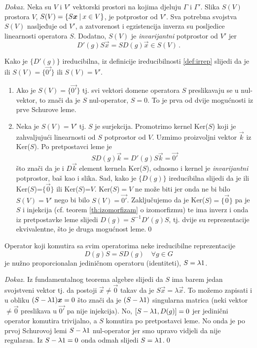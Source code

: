 \emph{Dokaz.}
Neka su $V$ i $V'$ vektorski prostori na kojima djeluju $\Gamma$ i $\Gamma'$.
Slika $S(V)$ prostora $V$, $S(V)=\{S\vec{x} \td x \in V \}$, je potprostor od $V'$. 
Sva potrebna svojstva
$S(V)$ nasljeđuje od $V'$, a zatvorenost i egzistencija inverza su 
posljedice linearnosti operatora $S$.
Dodatno, $S(V)$ je \emph{invarijantni} potprostor od $V'$ jer
$$D'(g)S\vec{x}=SD(g)\vec{x} \in S(V)\,.$$

Kako je $\{D'(g)\}$ ireducibilna, iz
definicije ireducibilnosti \ref{def:irrep} slijedi
da je ili $S(V)=\{\vec{0'}\}$ ili $S(V)=V'$.

\begin{enumerate}
\item Ako je $S(V)=\{\vec{0'}\}$ tj. svi vektori domene operatora $S$
    preslikavaju se u nul-vektor, to znači da je $S$ nul-operator,  $S=0$.
    To je prva od dvije mogućnosti iz prve Schurove leme.

\item Neka je $S(V)=V'$ tj. $S$ je surjekcija. Promotrimo 
    kernel Ker($S$) koji je zahvaljujući linearnosti od $S$
    potprostor od $V$.
    Uzmimo proizvoljni vektor $\vec{k}$ iz Ker($S$).
    Po pretpostavci leme je 
    $$ S D(g) \vec{k} = D'(g)S\vec{k} = \vec{0'}$$
    što znači da je i $D\vec{k}$ element kernela Ker($S$), odnosno
    i kernel je \emph{invarijantni} potprostor, baš kao i slika.
    Sad, kako je $\{D(g)\}$ ireducibilna slijedi da je ili
    Ker($S$)=$\{\vec{0}\}$ ili Ker($S$)=$V$.
    Ker($S$)$=V$ ne može biti jer onda ne bi bilo $S(V)=V'$ nego bi bilo
      $S(V)=\vec{0'}$.
    Zaključujemo da je Ker($S$)$=\{\vec{0}\}$ pa je $S$ i injekcija (cf.
    teorem \ref{th:izomorfizam} o izomorfizmu) te ima inverz
    i onda iz pretpostavke leme slijedi $D(g)=S^{-1}D'(g)S$, tj.
    dvije su reprezentacije ekvivalentne, što je druga mogućnost leme.\qed 
\end{enumerate}

\begin{teorem}
Operator koji komutira sa svim operatorima neke ireducibilne 
reprezentacije
\begin{displaymath}
  D(g)S=SD(g) \quad \forall g\in G
\end{displaymath}
je nužno proporcionalan jediničnom operatoru
(identiteti), $S = \lambda 1$.
\end{teorem}

\emph{Dokaz.} Iz fundamentalnog teorema algebre slijedi da $S$ ima
barem jedan svojstveni vektor tj. da postoji
$\vec{x}\neq\vec{0}$ takav da je $S\vec{x}=\lambda\vec{x}$.
To možemo zapisati i u obliku $(S-\lambda\Eins)\vec{x}=0$ što
znači da je $(S-\lambda1)$
singularna matrica (neki vektor $\neq \vec{0}$ preslikava u
$\vec{0'}$ pa nije injekcija).
No, $[S-\lambda1, D(g)]=0$
jer jedinični operator komutira trivijalno, a $S$ komutira po pretpostavci leme.
No onda je po prvoj Schurovoj lemi $S-\lambda1$ nul-operator jer smo upravo vidjeli
da nije regularan. Iz $S-\lambda1=0$ onda odmah slijedi $S=\lambda1$.\qed



